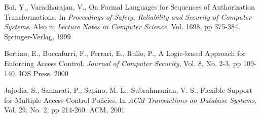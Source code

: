 \documentclass{llncs}
\begin{document}
  \begin{thebibliography}{5}
      Bai, Y., Varadharajan, V.,
      On Formal Languages for Sequences of Authorization Transformations.
      In \emph{Proceedings of Safety, Reliability and Security of Computer
      Systems}. Also in \emph{Lecture Notes in Computer Science},
      Vol. 1698, pp 375-384. Springer-Verlag, 1999

      Bertino, E., Buccafurri, F., Ferrari, E., Rullo, P.,
      A Logic-based Approach for Enforcing Access Control.
      \emph{Journal of Computer Security},
      Vol. 8, No. 2-3,
      pp 109-140.
      IOS Press, 2000

      Jajodia, S., Samarati, P., Sapino, M. L., Subrahmanian, V. S.,
      Flexible Support for Multiple Access Control Policies.
      In \emph{ACM Transactions on Database Systems},
      Vol. 29, No. 2,
      pp 214-260.
      ACM, 2001
  \end{thebibliography}
\end{document}
